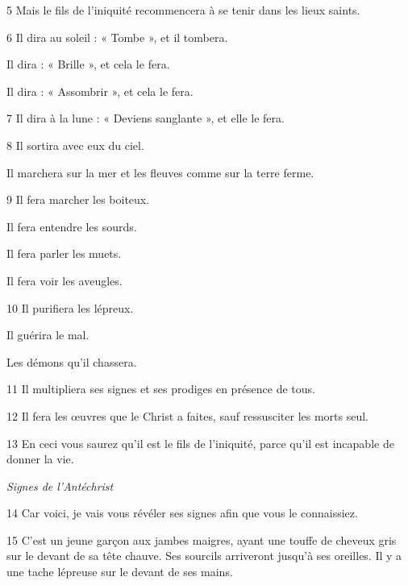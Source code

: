 \par 5 Mais le fils de l'iniquité recommencera à se tenir dans les lieux saints.

\par 6 Il dira au soleil : « Tombe », et il tombera.

\par Il dira : « Brille », et cela le fera.

\par Il dira : « Assombrir », et cela le fera.

\par 7 Il dira à la lune : « Deviens sanglante », et elle le fera.

\par 8 Il sortira avec eux du ciel.

\par Il marchera sur la mer et les fleuves comme sur la terre ferme.

\par 9 Il fera marcher les boiteux.

\par Il fera entendre les sourds.

\par Il fera parler les muets.

\par Il fera voir les aveugles.

\par 10 Il purifiera les lépreux.

\par Il guérira le mal.

\par Les démons qu'il chassera.

\par 11 Il multipliera ses signes et ses prodiges en présence de tous.

\par 12 Il fera les œuvres que le Christ a faites, sauf ressusciter les morts seul.

\par 13 En ceci vous saurez qu'il est le fils de l'iniquité, parce qu'il est incapable de donner la vie.

\par \textit{Signes de l'Antéchrist}

\par 14 Car voici, je vais vous révéler ses signes afin que vous le connaissiez.

\par 15 C'est un jeune garçon aux jambes maigres, ayant une touffe de cheveux gris sur le devant de sa tête chauve. Ses sourcils arriveront jusqu'à ses oreilles. Il y a une tache lépreuse sur le devant de ses mains.

